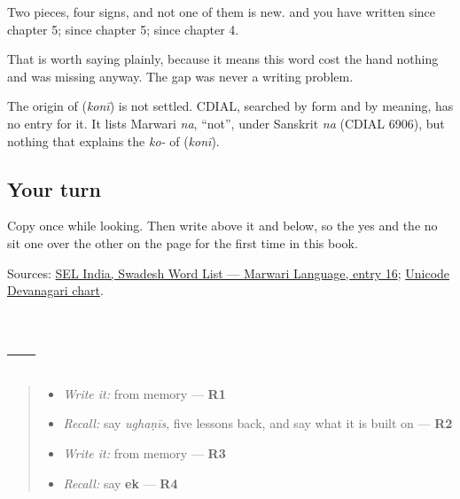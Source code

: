 Two pieces, four signs, and not one of them is new. \textbf{} and \textbf{} you have written since chapter 5; \textbf{} since chapter 5; \textbf{} since chapter 4.

That is worth saying plainly, because it means this word cost the hand nothing and was missing anyway. The gap was never a writing problem.

\begin{cousinweb}
The origin of \textbf{} (\emph{konī}) is not settled. CDIAL, searched by form and by meaning, has no entry for it. It lists Marwari \emph{na}, \textquotedblleft{}not\textquotedblright{}, under Sanskrit \emph{na} (CDIAL 6906), but nothing that explains the \emph{ko-} of \textbf{} (\emph{konī}).
\end{cousinweb}

\subsection*{Your turn}
Copy \textbf{} once while looking. Then write \textbf{ } above it and \textbf{} below, so the yes and the no sit one over the other on the page for the first time in this book.

\begin{tcolorbox}[breakable,colback=teal!4,colframe=teal!35!black,title={Before you move on}]
Sources: \href{https://selindia.org/wp-content/uploads/2025/05/SWL-Marwari\_IPA.pdf}{SEL India, Swadesh Word List — Marwari Language, entry 16}; \href{https://www.unicode.org/charts/PDF/U0900.pdf}{Unicode Devanagari chart}.
\end{tcolorbox}
\section[Practice]{  — }

\label{lesson:MW-R39-refuse-price}



\begin{quote}
\begin{itemize}
\raggedright
  \item \emph{Write it:} \textbf{} from memory — \textbf{R1}
  \item \emph{Recall:} say \emph{ughaṇīs}, five lessons back, and say what it is built on — \textbf{R2}
  \item \emph{Write it:} \textbf{} from memory — \textbf{R3}
  \item \emph{Recall:} say \textbf{ek} — \textbf{R4}
\end{itemize}
\end{quote}


